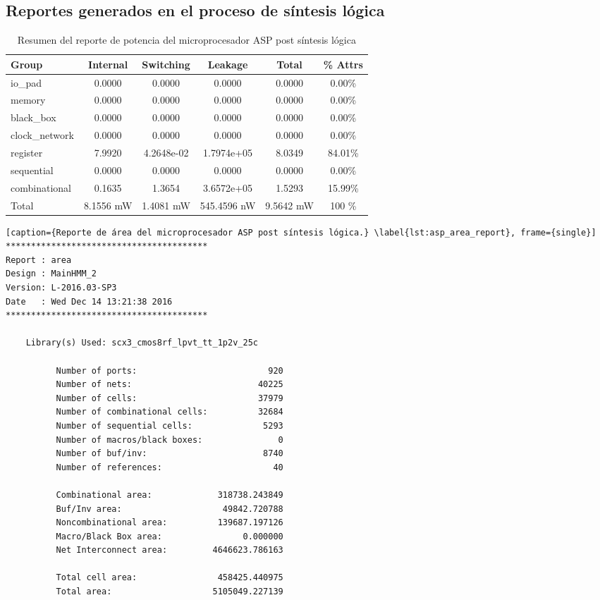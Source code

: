 \newpage

\subsection{Reportes generados en el proceso de síntesis lógica}
\begin{table}[ht]
\centering
\label{tab:power_asp}
\caption{Resumen del reporte de potencia del microprocesador ASP post síntesis lógica}
\begin{tabular}{||l | c | c | c | c | c |}
\hline
\hline
Group & Internal & Switching  & Leakage & Total & \% Attrs \\
\hline
io\_pad & 0.0000 & 0.0000 & 0.0000 & 0.0000 & 0.00\% \\
\hline
memory & 0.0000 & 0.0000 & 0.0000 & 0.0000 & 0.00\% \\
\hline
black\_box & 0.0000 & 0.0000 & 0.0000 & 0.0000 & 0.00\% \\
\hline
clock\_network & 0.0000 & 0.0000 & 0.0000 & 0.0000 & 0.00\% \\
\hline
register & 7.9920 & 4.2648e-02 & 1.7974e+05 & 8.0349 & 84.01\%\\
\hline
sequential  & 0.0000 & 0.0000 & 0.0000 & 0.0000 & 0.00\% \\
\hline
combinational & 0.1635 & 1.3654 & 3.6572e+05 & 1.5293 & 15.99\% \\
\hline
Total &  8.1556 mW & 1.4081 mW & 545.4596 nW & 9.5642 mW & 100 \%\\
\hline
\hline
\end{tabular}
\end{table}

\begin{lstlisting}[caption={Reporte de área del microprocesador ASP post síntesis lógica.} \label{lst:asp_area_report}, frame={single}]
****************************************
Report : area
Design : MainHMM_2
Version: L-2016.03-SP3
Date   : Wed Dec 14 13:21:38 2016
****************************************

	Library(s) Used: scx3_cmos8rf_lpvt_tt_1p2v_25c

          Number of ports:                          920
          Number of nets:                         40225
          Number of cells:                        37979
          Number of combinational cells:          32684
          Number of sequential cells:              5293
          Number of macros/black boxes:               0
          Number of buf/inv:                       8740
          Number of references:                      40

          Combinational area:             318738.243849
          Buf/Inv area:                    49842.720788
          Noncombinational area:          139687.197126
          Macro/Black Box area:                0.000000
          Net Interconnect area:         4646623.786163

          Total cell area:                458425.440975
          Total area:                    5105049.227139
\end{lstlisting}

